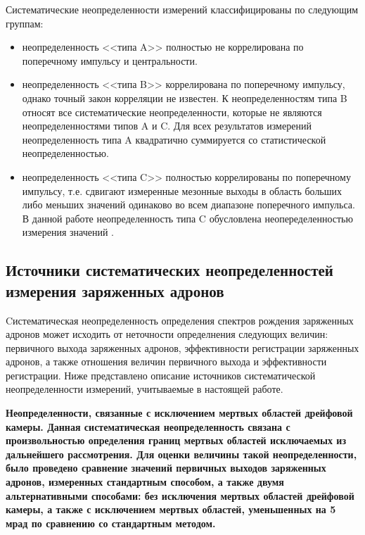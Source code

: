 Систематические неопределенности измерений классифицированы по следующим группам:
\begin{itemize}
	\item неопределенность <<типа A>> полностью не коррелирована по поперечному импульсу и центральности. 
	\item неопределенность <<типа B>> коррелирована по поперечному импульсу, однако точный закон корреляции не известен. К неопределенностям типа B относят все систематические неопределенности, которые не являются неопределенностями типов A и C. Для всех результатов измерений неопределенность типа A квадратично суммируется со статистической неопределенностью.
	\item неопределенность <<типа C>> полностью коррелированы по поперечному импульсу, т.е. сдвигают измеренные мезонные выходы в область больших либо меньших значений одинаково во всем диапазоне поперечного импульса. В данной работе неопределенность типа C обусловлена неопеределенностью измерения значений \Ncoll.
\end{itemize}

\subsection{Источники систематических неопределенностей измерения заряженных адронов} \label{sect3:SystSource}
Cистематическая неопределенность определения спектров рождения заряженных адронов может исходить от неточности определнения следующих величин: первичного выхода заряженных адронов, эффективности регистрации заряженных адронов, а также отношения величин первичного выхода и эффективности регистрации. Ниже представлено описание источников систематической неопределенности измерений, учитываемые в настоящей работе. 

\bfseries Неопределенности, связанные с исключением мертвых областей дрейфовой камеры.
\mdseries
Данная систематическая неопределенность связана с произвольностью определения границ мертвых областей исключаемых из дальнейшего рассмотрения. Для оценки величины такой неопределенности, было проведено сравнение значений первичных выходов заряженных адронов, измеренных стандартным способом, а также двумя альтернативными способами: без  исключения мертвых областей дрейфовой камеры, а также с исключением мертвых областей, уменьшенных на 5 мрад по сравнению со стандартным методом. 


